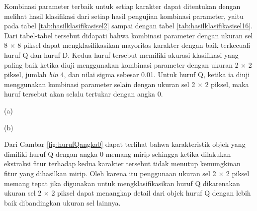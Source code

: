 \noindent Kombinasi parameter terbaik untuk setiap karakter dapat ditentukan dengan melihat hasil klasifikasi dari setiap hasil pengujian kombinasi parameter, yaitu pada tabel \ref{tab:hasilklasifikasisel2} sampai dengan tabel \ref{tab:hasilklasifikasisel16}. Dari tabel-tabel tersebut didapati bahwa kombinasi parameter dengan ukuran sel 8 $\times$ 8 piksel dapat mengklasifikasikan mayoritas karakter dengan baik terkecuali huruf Q dan huruf D. Kedua huruf tersebut memiliki akurasi klasifikasi yang paling baik ketika diuji menggunakan kombinasi parameter dengan ukuran 2 $\times$ 2 piksel, jumlah \textit{bin} 4, dan nilai sigma sebesar 0.01. Untuk huruf Q, ketika ia diuji menggunakan kombinasi parameter selain dengan ukuran sel 2 $\times$ 2 piksel, maka huruf tersebut akan selalu tertukar dengan angka 0.

\begin{adjustbox}{width=1\textwidth}
	\noindent\begin{minipage}{\linewidth}
		\centering{}
		\begin{center}
			(a)
		\end{center}
	\end{minipage}
\end{adjustbox}

\begin{adjustbox}{width=1\textwidth}
	\noindent\begin{minipage}{\linewidth}
		\centering{}
		\begin{center}
			(b)
		\end{center}
		\label{fig:hurufQangka0}
	\end{minipage}
\end{adjustbox}

\noindent Dari Gambar \ref{fig:hurufQangka0} dapat terlihat bahwa karakteristik objek yang dimiliki huruf Q dengan angka 0 memang mirip sehingga ketika dilakukan ekstraksi fitur terhadap kedua karakter tersebut tidak menutup kemungkinan fitur yang dihasilkan mirip. Oleh karena itu penggunaan ukuran sel 2 $\times$ 2 piksel memang tepat jika digunakan untuk mengklasifikasikan huruf Q dikarenakan ukuran sel 2 $\times$ 2 piksel dapat menangkap detail dari objek huruf Q dengan lebih baik dibandingkan ukuran sel lainnya.

